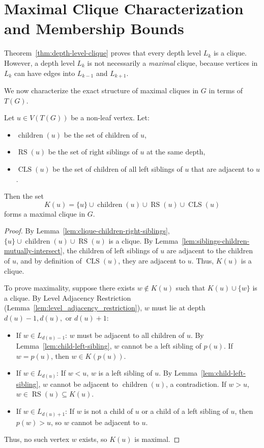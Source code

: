\section{Maximal Clique Characterization and Membership Bounds}
\label{sec:struct_maximal_cliques}

Theorem~\ref{thm:depth-level-clique} proves that every depth level $L_k$ is a clique. However, a depth level $L_k$ is not necessarily a \emph{maximal} clique, because vertices in $L_k$ can have edges into $L_{k-1}$ and $L_{k+1}$.

We now characterize the exact structure of maximal cliques in $G$ in terms of $T(G)$.

\begin{lemma}
\label{lem:maximal-clique-decomposition}
Let $u \in V(T(G))$ be a non-leaf vertex. Let:
\begin{itemize}
    \item $\operatorname{children}(u)$ be the set of children of $u$,
    \item $\operatorname{RS}(u)$ be the set of right siblings of $u$ at the same depth,
    \item $\operatorname{CLS}(u)$ be the set of children of all left siblings of $u$ that are adjacent to $u$.
\end{itemize}
Then the set
\begin{equation}
    K(u) = \{u\} \cup \operatorname{children}(u) \cup \operatorname{RS}(u) \cup \operatorname{CLS}(u)
\end{equation}
forms a maximal clique in $G$.
\end{lemma}
\begin{proof}
By Lemma~\ref{lem:clique-children-right-siblings}, $\{u\} \cup \operatorname{children}(u) \cup \operatorname{RS}(u)$ is a clique. By Lemma~\ref{lem:siblings-children-mutually-intersect}, the children of left siblings of $u$ are adjacent to the children of $u$, and by definition of $\operatorname{CLS}(u)$, they are adjacent to $u$. Thus, $K(u)$ is a clique.

To prove maximality, suppose there exists $w \notin K(u)$ such that $K(u) \cup \{w\}$ is a clique. By Level Adjacency Restriction (Lemma~\ref{lem:level_adjacency_restriction}), $w$ must lie at depth $d(u)-1, d(u),$ or $d(u)+1$:
\begin{itemize}
    \item If $w \in L_{d(u)-1}$: $w$ must be adjacent to all children of $u$. By Lemma~\ref{lem:child-left-sibling}, $w$ cannot be a left sibling of $p(u)$. If $w = p(u)$, then $w \in K(p(u))$.
    \item If $w \in L_{d(u)}$: If $w < u$, $w$ is a left sibling of $u$. By Lemma~\ref{lem:child-left-sibling}, $w$ cannot be adjacent to $\operatorname{children}(u)$, a contradiction. If $w > u$, $w \in \operatorname{RS}(u) \subseteq K(u)$.
    \item If $w \in L_{d(u)+1}$: If $w$ is not a child of $u$ or a child of a left sibling of $u$, then $p(w) > u$, so $w$ cannot be adjacent to $u$.
\end{itemize}
Thus, no such vertex $w$ exists, so $K(u)$ is maximal.
\end{proof}


